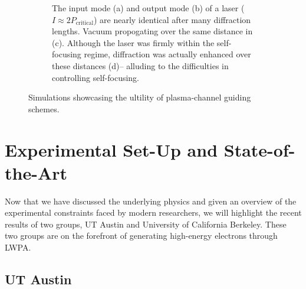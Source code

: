 \documentclass[12pt,letter]{article}
\begin{document}
\begin{figure}
\begin{singlespace*}
\begin{subfigure}[t]{.45\textwidth}
    \caption{\small The input mode (a) and output mode (b)
of a laser ($I\approx 2 P_\textrm{critical}$) are nearly identical after many
diffraction lengths. Vacuum propogating over the same distance in (c).
Although the laser was firmly within the
self-focusing regime, diffraction was actually enhanced over these
distances (d)-- alluding to the difficulties in controlling self-focusing.\cite{geddes2005guiding} }
\end{subfigure}
\end{singlespace*}
\caption{Simulations showcasing the ultility of plasma-channel guiding
schemes.\label{fig:pchan}}
\end{figure}


  \section{Experimental Set-Up and State-of-the-Art}
  Now that we have discussed the underlying physics and given an overview of the
  experimental constraints  faced by modern researchers, we will highlight the
  recent results of two groups, UT
Austin and University of California Berkeley. These two groups are
on the forefront of generating  high-energy electrons through LWPA.
\subsection{UT Austin}
\end{document}
